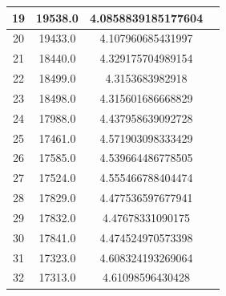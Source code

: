 \begin{center}
\begin{tabular}{||c c c c||}
		\hline
			19 & 19538.0 & 4.0858839185177604 \\
		

		\hline
			20 & 19433.0 & 4.107960685431997 \\
		

		\hline
			21 & 18440.0 & 4.329175704989154 \\
		

		\hline
			22 & 18499.0 & 4.3153683982918 \\
		

		\hline
			23 & 18498.0 & 4.315601686668829 \\
		

		\hline
			24 & 17988.0 & 4.437958639092728 \\
		

		\hline
			25 & 17461.0 & 4.571903098333429 \\
		

		\hline
			26 & 17585.0 & 4.539664486778505 \\
		

		\hline
			27 & 17524.0 & 4.555466788404474 \\
		

		\hline
			28 & 17829.0 & 4.477536597677941 \\
		

		\hline
			29 & 17832.0 & 4.47678331090175 \\
		

		\hline
			30 & 17841.0 & 4.474524970573398 \\
		

		\hline
			31 & 17323.0 & 4.608324193269064 \\
		

		\hline
			32 & 17313.0 & 4.61098596430428 \\  [1ex] 
 \hline
\end{tabular}
\end{center}
 